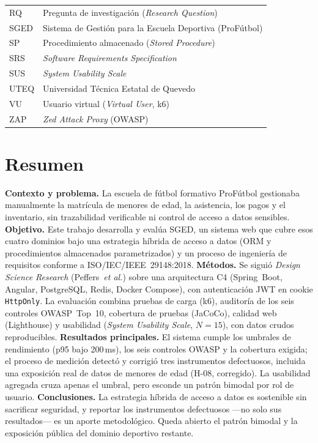 \documentclass[11pt,a4paper]{article}
\begin{document}
\begin{center}
\begin{tabular}{@{}ll@{}}
RQ & Pregunta de investigación (\emph{Research Question}) \\
SGED & Sistema de Gestión para la Escuela Deportiva (ProFútbol) \\
SP & Procedimiento almacenado (\emph{Stored Procedure}) \\
SRS & \emph{Software Requirements Specification} \\
SUS & \emph{System Usability Scale} \\
UTEQ & Universidad Técnica Estatal de Quevedo \\
VU & Usuario virtual (\emph{Virtual User}, k6) \\
ZAP & \emph{Zed Attack Proxy} (OWASP) \\
\bottomrule
\end{tabular}
\end{center}

\newpage

\section*{Resumen}
\label{sec:resumen-es}

\textbf{Contexto y problema.} La escuela de fútbol formativo ProFútbol
gestionaba manualmente la matrícula de menores de edad, la asistencia,
los pagos y el inventario, sin trazabilidad verificable ni control de
acceso a datos sensibles. \textbf{Objetivo.} Este trabajo desarrolla y
evalúa SGED, un sistema web que cubre esos cuatro dominios bajo una
estrategia híbrida de acceso a datos (ORM y procedimientos almacenados
parametrizados) y un proceso de ingeniería de requisitos conforme a
ISO/IEC/IEEE~29148:2018. \textbf{Métodos.} Se siguió \emph{Design
Science Research} (Peffers~\emph{et al.}) sobre una arquitectura C4
(Spring~Boot, Angular, PostgreSQL, Redis, Docker Compose), con
autenticación JWT en cookie \texttt{HttpOnly}. La evaluación combina
pruebas de carga (k6), auditoría de los seis controles OWASP~Top~10,
cobertura de pruebas (JaCoCo), calidad web (Lighthouse) y usabilidad
(\emph{System Usability Scale}, $N=15$), con datos crudos
reproducibles. \textbf{Resultados principales.} El sistema cumple los
umbrales de rendimiento (p95 bajo 200\,ms), los seis controles OWASP y
la cobertura exigida; el proceso de medición detectó y corrigió tres
instrumentos defectuosos, incluida una exposición real de datos de
menores de edad (H-08, corregido). La usabilidad agregada cruza apenas
el umbral, pero esconde un patrón bimodal por rol de usuario.
\textbf{Conclusiones.} La estrategia híbrida de acceso a datos es
sostenible sin sacrificar seguridad, y reportar los instrumentos
defectuosos —no solo sus resultados— es un aporte metodológico. Queda
abierto el patrón bimodal y la exposición pública del dominio deportivo
restante.
\end{document}
